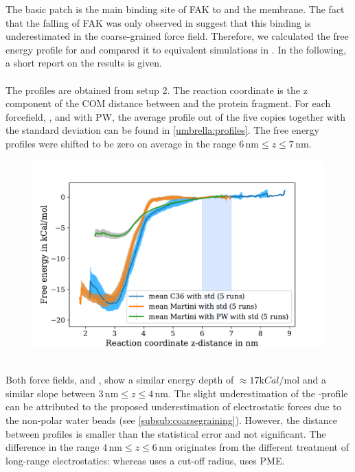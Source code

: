 \label{results:umbrella}
The basic patch is the main binding site of FAK to \pip{} and the membrane. The fact that the falling of FAK was only observed in \martini{} suggest that this binding is underestimated in the coarse-grained force field. Therefore, we calculated the free energy profile for \martini{} and compared it to equivalent simulations in \charmm{}. In the following, a short report on the results is given.\\
\\
The profiles are obtained from setup 2. The reaction coordinate is the z component of the COM distance between \pip{} and the protein fragment. For each forcefield, \charmm{}, \martini{} and \martini{} with PW, the average profile out of the five copies together with the standard deviation can be found in \autoref{umbrella:profiles}. The free energy profiles were shifted to be zero on average in the range $6\,\si{\nano\metre} \le z \le 7\,\si{\nano\metre}$.\\
%
%
%
\begin{figure}[hbt]
	\centering
	\includegraphics[width=.8\textwidth]{figures/results/umbrella}
	\label{umbrella:profiles}
\end{figure}
%
%
%
\\
Both force fields, \charmm{} and \martini{}, show a similar energy depth of $\approx 17 \si{\kilo Cal/\mole}$ and a similar slope between $3\,\si{\nano\metre} \le z \le 4\,\si{\nano\metre}$. The slight underestimation of the \martini{}-profile can be attributed to the proposed underestimation of electrostatic forces due to the non-polar water beads (see \autoref{subsub:coarsegraining}). However, the distance between profiles is smaller than the statistical error and not significant. The difference in the range $4\,\si{\nano\metre} \le z \le 6\,\si{\nano\metre}$ originates from the different treatment of long-range electrostatics: whereas \martini{} uses a cut-off radius, \charmm{} uses PME.\\
